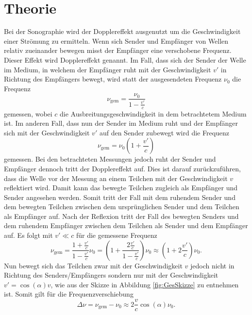 
\section{Theorie}
\label{sec:Theorie}

Bei der Sonographie wird der Dopplereffekt ausgenutzt um die Geschwindigkeit einer Strömung zu ermitteln.
Wenn sich Sender und Empfänger von Wellen relativ zueinander bewegen misst der Empfänger eine verschobene Frequenz. Dieser Effekt wird Dopplereffekt genannt. Im Fall, dass sich der Sender der Welle im Medium, in welchem der Empfänger ruht mit der Geschwindigkeit $v'$ in Richtung des Empfängers bewegt, wird statt der ausgesendeten Frequenz $\nu_0$ die Frequenz
\begin{equation}
	\nu_\text{gem}=\frac{\nu_0}{1-\frac{v'}{c}}
\end{equation}
gemessen, wobei $c$ die Ausbreitungsgeschwindigkeit in dem betrachtetem Medium ist. Im anderen Fall, dass nun der Sender im Medium ruht und der Empfänger sich mit der Geschwindigkeit $v'$ auf den Sender zubewegt wird die Frequenz
\begin{equation}
	\nu_\text{gem}=\nu_0(1+\frac{v'}{c})
\end{equation}
gemessen. Bei den betrachteten Messungen jedoch ruht der Sender und Empfänger dennoch tritt der Dopplereffekt auf. Dies ist darauf zurückzuführen, dass die Welle vor der Messung an einem Teilchen mit der Geschwindigkeit $v$ reflektiert wird. Damit kann das bewegte Teilchen zugleich als Empfänger und Sender angesehen werden. Somit tritt der Fall mit dem ruhendem Sender und dem bewegten Teilchen zwischen dem ursprünglichen Sender und dem Teilchen als Empfänger auf. Nach der Reflexion tritt der Fall des bewegten Senders und dem ruhendem Empfänger zwischen dem Teilchen als Sender und dem Empfänger auf. Es folgt mit $v' \ll c$ für die gemessene Frequenz
\begin{equation}
	\nu_\text{gem}=\frac{1+\frac{v'}{c}}{1-\frac{v'}{c}} \nu_0=\left(1+\frac{2\frac{v'}{c}}{1-\frac{v'}{c}}\right) \nu_0\approx \left(1+2\frac{v'}{c}\right) \nu_0 \text{.}
\end{equation}
Nun bewegt sich das Teilchen zwar mit der Geschwindigkeit $v$ jedoch nicht in Richtung des Senders/Empfängers sondern nur mit der Geschwindigkeit $v'= \cos(\alpha) v$, wie aus der Skizze in Abbildung \ref{fig:GesSkizze} zu entnehmen ist. Somit gilt für die Frequenzverschiebung
\begin{equation}
	\Delta \nu = \nu_\text{gem}-\nu_0 \approx 2 \frac{v}{c} \cos(\alpha) \nu_0 \text{.}\label{eq:deltaf}
\end{equation}
